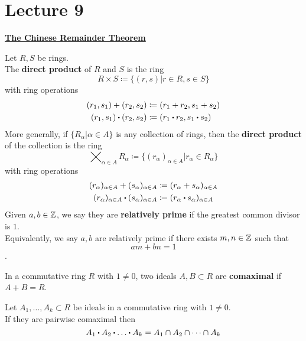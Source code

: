 \documentclass[../Main.tex]{subfiles}
\begin{document}
\chapter{Lecture 9}
\underline{\textbf{\Large The Chinese Remainder Theorem}}
\begin{dfn}
	Let $R,S$ be rings.\\
	The \textbf{direct product} of $R$ and $S$ is the ring
	\[R\times S \coloneqq \{(r,s)|r\in R, s\in S \}\]
	with ring operations
	\begin{align*}
		(r_1,s_1)+(r_2,s_2)&\coloneqq (r_1+r_2,s_1+s_2)\\
		(r_1,s_1)\rdot (r_2,s_2)&\coloneqq (r_1\rdot r_2,s_1\rdot s_2)
	\end{align*}
	More generally, if $\{R_\alpha|\alpha\in A\}$ is any collection of rings, then the \textbf{direct product} of the collection is the ring
	\[\bigtimes_{\alpha \in A}R_\alpha \coloneqq \{(r_\alpha)_{\alpha\in A}| r_\alpha \in R_\alpha\}\]
	with ring operations
	\begin{align*}
	(r_\alpha)_{\alpha\in A}+(s_\alpha)_{\alpha\in A}&\coloneqq (r_\alpha +s_\alpha)_{\alpha\in A}\\
	(r_\alpha)_{\alpha\in A}\rdot (s_\alpha)_{\alpha\in A}&\coloneqq (r_\alpha \rdot s_\alpha)_{\alpha\in A}\\
	\end{align*}
	Given $a,b\in \mathbb{Z}$, we say they are \textbf{relatively prime} if the greatest common divisor is $1$.\\
	Equivalently, we say $a,b$ are relatively prime if there exists $m,n\in\mathbb{Z}$ such that \[am+bn=1\].
\end{dfn}
\begin{dfn}
	In a commutative ring $R$ with $1\ne 0$, two ideals $A,B\subset R$ are \textbf{comaximal} if $A+B=R$.
\end{dfn}
\begin{thm}
	Let $A_1,\dots,A_k\subset R$ be ideals in a commutative ring with $1\ne 0$.\\
	If they are pairwise comaximal then
	\[A_1\rdot A_2\rdot \dots \rdot A_k = A_1 \cap A_2 \cap \dots \cap A_k\]
\end{thm}
\end{document}
